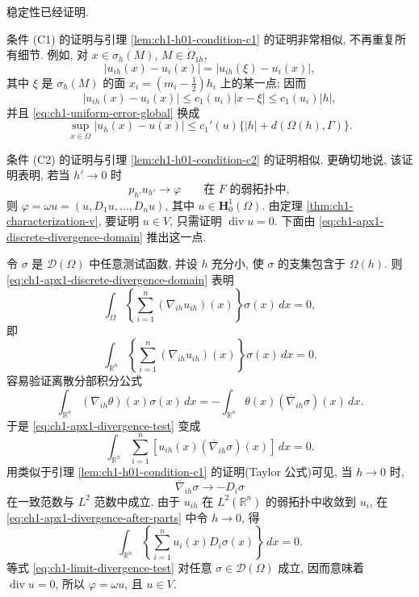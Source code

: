 \begin{Proof}
稳定性已经证明.

条件 (C1) 的证明与引理 \ref{lem:ch1-h01-condition-c1} 的证明非常相似, 不再重复所有细节. 例如, 对 $x\in\sigma_h(M)$, $M\in\mathring\Omega_{1h}$,
\[
|u_{ih}(x)-u_i(x)|=|u_{ih}(\xi)-u_i(x)|,
\]
其中 $\xi$ 是 $\sigma_h(M)$ 的面 $x_i=(m_i-\frac12)h_i$ 上的某一点; 因而
\[
|u_{ih}(x)-u_i(x)|\leq c_1(u_i)|x-\xi|\leq c_1(u_i)|h|,
\]
并且 \eqref{eq:ch1-uniform-error-global} 换成
\begin{equation}
\sup_{x\in\Omega}|u_h(x)-u(x)|
\leq c_1'(u)\{|h|+d(\Omega(h),\Gamma)\}.
\label{eq:ch1-apx1-uniform-restriction-error}
\end{equation}

条件 (C2) 的证明与引理 \ref{lem:ch1-h01-condition-c2} 的证明相似. 更确切地说, 该证明表明, 若当 $h'\to0$ 时
\[
p_{h'}u_{h'}\to\varphi\qquad\text{在 }F\text{ 的弱拓扑中},
\]
则 $\varphi=\omega u=(u,D_1u,\ldots,D_nu)$, 其中 $u\in\mathbf H_0^1(\Omega)$. 由定理 \ref{thm:ch1-characterization-v}, 要证明 $u\in V$, 只需证明 $\operatorname{div}u=0$. 下面由 \eqref{eq:ch1-apx1-discrete-divergence-domain} 推出这一点.

令 $\sigma$ 是 $\mathcal D(\Omega)$ 中任意测试函数, 并设 $h$ 充分小, 使 $\sigma$ 的支集包含于 $\Omega(h)$. 则 \eqref{eq:ch1-apx1-discrete-divergence-domain} 表明
\[
\int_\Omega\left\{\sum_{i=1}^n(\nabla_{ih}u_{ih})(x)\right\}\sigma(x)\,dx=0,
\]
即
\begin{equation}
\int_{\mathbb R^n}\left\{\sum_{i=1}^n(\nabla_{ih}u_{ih})(x)\right\}\sigma(x)\,dx=0.
\label{eq:ch1-apx1-divergence-test}
\end{equation}
容易验证离散分部积分公式
\begin{equation}
\int_{\mathbb R^n}(\nabla_{ih}\theta)(x)\sigma(x)\,dx
=-\int_{\mathbb R^n}\theta(x)(\overline\nabla_{ih}\sigma)(x)\,dx.
\label{eq:ch1-forward-backward-integration-by-parts}
\end{equation}
于是 \eqref{eq:ch1-apx1-divergence-test} 变成
\begin{equation}
\int_{\mathbb R^n}\sum_{i=1}^n
\left[u_{ih}(x)(\overline\nabla_{ih}\sigma)(x)\right]\,dx=0.
\label{eq:ch1-apx1-divergence-after-parts}
\end{equation}
用类似于引理 \ref{lem:ch1-h01-condition-c1} 的证明(Taylor 公式)可见, 当 $h\to0$ 时,
\begin{equation}
\overline\nabla_{ih}\sigma\to-D_i\sigma
\label{eq:ch1-backward-difference-test-limit}
\end{equation}
在一致范数与 $L^2$ 范数中成立. 由于 $u_{ih}$ 在 $L^2(\mathbb R^n)$ 的弱拓扑中收敛到 $u_i$, 在 \eqref{eq:ch1-apx1-divergence-after-parts} 中令 $h\to0$, 得
\begin{equation}
\int_{\mathbb R^n}\left\{\sum_{i=1}^nu_i(x)D_i\sigma(x)\right\}\,dx=0.
\label{eq:ch1-limit-divergence-test}
\end{equation}
等式 \eqref{eq:ch1-limit-divergence-test} 对任意 $\sigma\in\mathcal D(\Omega)$ 成立, 因而意味着 $\operatorname{div}u=0$, 所以 $\varphi=\omega u$, 且 $u\in V$.
\end{Proof}

